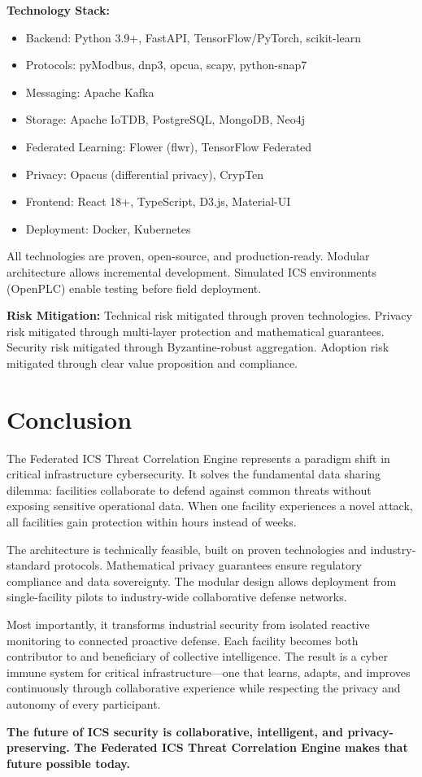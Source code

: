 \documentclass[12pt,a4paper]{article}
\begin{document}
\textbf{Technology Stack:}
\begin{itemize}[leftmargin=1cm,itemsep=0pt]
    \item Backend: Python 3.9+, FastAPI, TensorFlow/PyTorch, scikit-learn
    \item Protocols: pyModbus, dnp3, opcua, scapy, python-snap7
    \item Messaging: Apache Kafka
    \item Storage: Apache IoTDB, PostgreSQL, MongoDB, Neo4j
    \item Federated Learning: Flower (flwr), TensorFlow Federated
    \item Privacy: Opacus (differential privacy), CrypTen
    \item Frontend: React 18+, TypeScript, D3.js, Material-UI
    \item Deployment: Docker, Kubernetes
\end{itemize}

All technologies are proven, open-source, and production-ready. Modular architecture allows incremental development. Simulated ICS environments (OpenPLC) enable testing before field deployment.

\textbf{Risk Mitigation:}
Technical risk mitigated through proven technologies. Privacy risk mitigated through multi-layer protection and mathematical guarantees. Security risk mitigated through Byzantine-robust aggregation. Adoption risk mitigated through clear value proposition and compliance.

\section{Conclusion}

The Federated ICS Threat Correlation Engine represents a paradigm shift in critical infrastructure cybersecurity.
It solves the fundamental data sharing dilemma: facilities collaborate to defend against common threats without exposing sensitive operational data.
When one facility experiences a novel attack, all facilities gain protection within hours instead of weeks.

The architecture is technically feasible, built on proven technologies and industry-standard protocols.
Mathematical privacy guarantees ensure regulatory compliance and data sovereignty.
The modular design allows deployment from single-facility pilots to industry-wide collaborative defense networks.

Most importantly, it transforms industrial security from isolated reactive monitoring to connected proactive defense.
Each facility becomes both contributor to and beneficiary of collective intelligence.
The result is a cyber immune system for critical infrastructure—one that learns, adapts, and improves continuously through collaborative experience while respecting the privacy and autonomy of every participant.

\textbf{The future of ICS security is collaborative, intelligent, and privacy-preserving. The Federated ICS Threat Correlation Engine makes that future possible today.}
\end{document}
